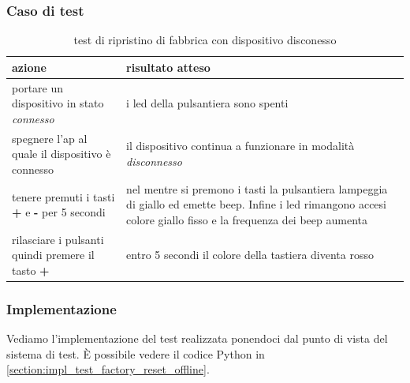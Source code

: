 \documentclass[12pt,a4paper,twoside,titlepage]{book}
\begin{document}
\subsubsection{Caso di test}

\begin{table}
    \centering
    \begin{tabular}{| p{} | p{} |}
        \hline
        \textbf{azione} & \textbf{risultato atteso} \\ \hline
        portare un dispositivo in stato \textit{connesso} & i \acrshort{led} della pulsantiera sono spenti \\ \hline
        spegnere l'\acrshort{ap} al quale il dispositivo è connesso & il dispositivo continua a funzionare in modalità \textit{disconnesso} \\ \hline
        tenere premuti i tasti \textbf{+} e \textbf{-} per 5 secondi & nel mentre si premono i tasti la pulsantiera lampeggia di giallo ed emette beep. Infine i \acrshort{led} rimangono accesi colore giallo fisso e la frequenza dei beep aumenta \\ \hline
        rilasciare i pulsanti quindi premere il tasto \textbf{+} & entro 5 secondi il colore della tastiera diventa rosso \\ \hline
    \end{tabular}
    \caption{test di ripristino di fabbrica con dispositivo disconesso}
\end{table}

\subsubsection{Implementazione}
Vediamo l'implementazione del test realizzata ponendoci dal punto di vista del sistema di test. 
È possibile vedere il codice Python in \autoref{section:impl_test_factory_reset_offline}.
\end{document}
